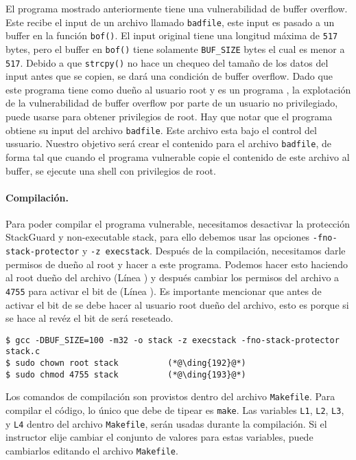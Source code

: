 El programa mostrado anteriormente tiene una vulnerabilidad de buffer overflow. Este recibe el input de un archivo llamado \texttt{badfile}, este input es pasado a un buffer en la función  {\tt bof()}. El input original tiene una longitud máxima de \texttt{517} bytes, pero el buffer en {\tt bof()}  tiene solamente  \texttt{BUF\_SIZE} bytes el cual es menor a \texttt{517}.
Debido a que {\tt strcpy()} no hace un chequeo del tamaño de los datos del input antes que se copien, se dará una condición de buffer overflow.
Dado que este programa tiene como dueño al usuario root y es un programa \setuid, la explotación de la vulnerabilidad de buffer overflow por parte de un usuario no privilegiado, puede usarse para obtener privilegios de root.
Hay que notar que el programa obtiene su input del archivo \texttt{badfile}. Este archivo esta bajo el control del ussuario. Nuestro objetivo será crear el contenido para el archivo \texttt{badfile}, de forma tal que cuando el programa vulnerable copie el contenido de este archivo al buffer, se ejecute una shell con privilegios de root.


\paragraph{Compilación.}
Para poder compilar el programa vulnerable, necesitamos desactivar la protección StackGuard y non-executable stack, para ello debemos usar las opciones \texttt{-fno-stack-protector} y \texttt{-z execstack}.
Después de la compilación, necesitamos darle permisos de dueño al root y hacer \setuid a este programa. Podemos hacer esto haciendo al root dueño del archivo (Línea ) y después cambiar los permisos del archivo a \texttt{4755} para activar el bit de \setuid (Línea ). Es importante mencionar que antes de activar el bit de \setuid se debe hacer al usuario root dueño del archivo, esto es porque si se hace al revéz el bit de \setuid será reseteado.


\begin{lstlisting}
$ gcc -DBUF_SIZE=100 -m32 -o stack -z execstack -fno-stack-protector stack.c
$ sudo chown root stack          (*@\ding{192}@*)
$ sudo chmod 4755 stack          (*@\ding{193}@*)
\end{lstlisting}

Los comandos de compilación son provistos dentro del archivo \texttt{Makefile}. Para compilar el código, lo único que debe de tipear es \texttt{make}. Las variables \texttt{L1}, \texttt{L2}, \texttt{L3}, y \texttt{L4} dentro del archivo \texttt{Makefile}, serán usadas durante la compilación.
Si el instructor elije cambiar el conjunto de valores para estas variables, puede cambiarlos editando el archivo \texttt{Makefile}.


